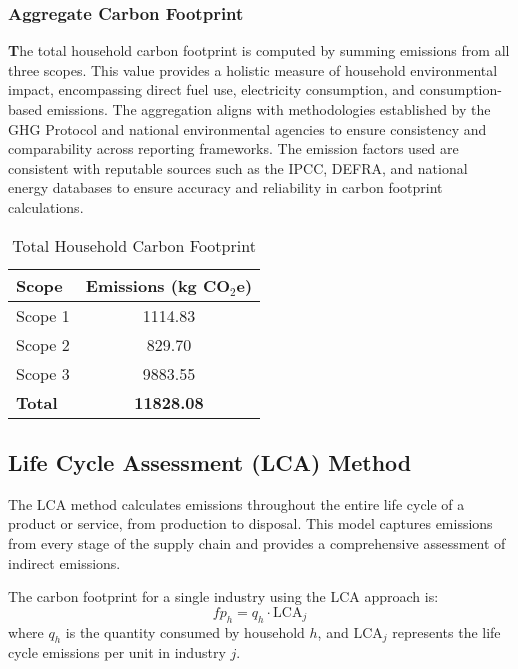 \documentclass[12pt,a4paper]{article}
\begin{document}
\subsubsection*{Aggregate Carbon Footprint}



\textbf The total household carbon footprint is computed by summing emissions from all three scopes. This value provides a holistic measure of household environmental impact, encompassing direct fuel use, electricity consumption, and consumption-based emissions. The aggregation aligns with methodologies established by the GHG Protocol and national environmental agencies to ensure consistency and comparability across reporting frameworks. The emission factors used are consistent with reputable sources such as the IPCC, DEFRA, and national energy databases to ensure accuracy and reliability in carbon footprint calculations.

\begin{table}[h]
    \centering
    \begin{tabular}{|l|c|}
        \hline
        \textbf{Scope} & \textbf{Emissions (kg CO$_2$e)} \\
        \hline
        Scope 1 & 1114.83 \\
        Scope 2 & 829.70 \\
        Scope 3 & 9883.55 \\
        \textbf{Total} & \textbf{11828.08} \\
        \hline
    \end{tabular}
    \caption{Total Household Carbon Footprint}
    \label{tab:total_carbon_footprint}
\end{table}
\vspace{150 pt}

\subsection{Life Cycle Assessment (LCA) Method}
The LCA method calculates emissions throughout the entire life cycle of a product or service, from production to disposal. This model captures emissions from every stage of the supply chain and provides a comprehensive assessment of indirect emissions.

The carbon footprint for a single industry using the LCA approach is:
\[
fp_h = q_h \cdot \text{LCA}_j
\]
where \(q_h\) is the quantity consumed by household \(h\), and \(\text{LCA}_j\) represents the life cycle emissions per unit in industry \(j\).
\end{document}

